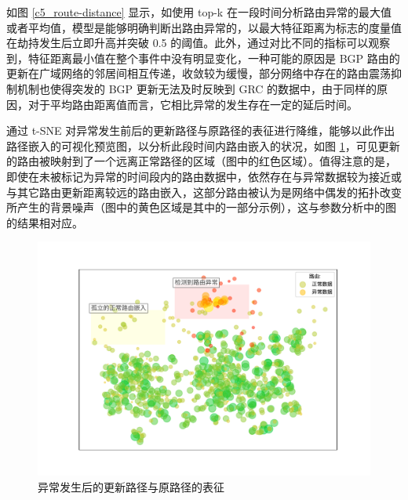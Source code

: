 如图 \ref{c5_route-distance} 显示，如使用 top-k 在一段时间分析路由异常的最大值或者平均值，模型是能够明确判断出路由异常的，以最大特征距离为标志的度量值在劫持发生后立即升高并突破 0.5 的阈值。此外，通过对比不同的指标可以观察到，特征距离最小值在整个事件中没有明显变化，一种可能的原因是 BGP 路由的更新在广域网络的邻居间相互传递，收敛较为缓慢，部分网络中存在的路由震荡抑制机制也使得突发的 BGP 更新无法及时反映到 GRC 的数据中，由于同样的原因，对于平均路由距离值而言，它相比异常的发生存在一定的延后时间。

通过 t-SNE 对异常发生前后的更新路径与原路径的表征进行降维，能够以此作出路径嵌入的可视化预览图，以分析此段时间内路由嵌入的状况，如图 \ref{c5_case-study-scatter}，可见更新的路由被映射到了一个远离正常路径的区域（图中的红色区域）。值得注意的是，即使在未被标记为异常的时间段内的路由数据中，依然存在与异常数据较为接近或与其它路由更新距离较远的路由嵌入，这部分路由被认为是网络中偶发的拓扑改变所产生的背景噪声（图中的黄色区域是其中的一部分示例），这与参数分析中的图 \label{c5_arg-analysis} 的结果相对应。

\begin{figure}[h]
    \includegraphics[width=\linewidth]{chapter/c5_images/c5_case-study-scatter.pdf}
    \caption{异常发生后的更新路径与原路径的表征}
    \label{c5_case-study-scatter}
\end{figure}
